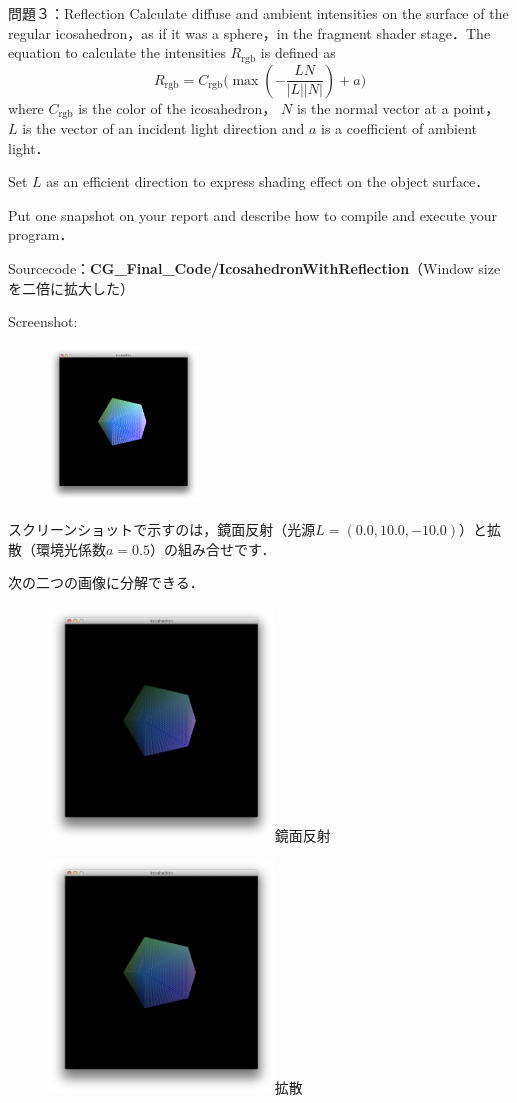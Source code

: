 \documentclass[a4paper,11pt]{jsarticle}
\numberwithin{theorem}{section}  %
\numberwithin{equation}{section} %
\begin{document}
\newpage

\begin{itembox}[l]{問題３：Reflection}
Calculate diffuse and ambient intensities on the surface of the regular icosahedron，as if it was a sphere，in the fragment shader stage．The equation to calculate the intensities $R_{\text{rgb}}$ is defined as
\[
R_{\text{rgb}} = C_{\text{rgb}}\Bigr( \max ( - \frac{LN}{|L||N|} ) + a \Bigr)
\]
where $C_{\text{rgb}}$ is the color of
the icosahedron， $N$ is the normal vector at a point， $L$ is the vector of an incident light direction and $a$ is a coefficient of
ambient light．

Set $L$ as an efficient direction to express shading effect on the object surface．



Put one snapshot on your report and describe how to compile and execute your program．
\end{itembox}

Sourcecode：{\bf CG\_Final\_Code/IcosahedronWithReflection}（Window sizeを二倍に拡大した）

Screenshot:
\begin{figure}[H]
\includegraphics[bb=0 0 444 1200,width=4cm]{Icosahedron_a_and_b.pdf}
\end{figure}
スクリーンショットで示すのは，鏡面反射（光源$L=(0.0,10.0,-10.0)$）と拡散（環境光係数$a=0.5$）の組み合せです．

次の二つの画像に分解できる．
\begin{figure}[H]
\includegraphics[bb=0 0 444 751,width=6cm]{Icosahedron_a.pdf}鏡面反射
\end{figure}
\begin{figure}[H]
\includegraphics[bb=0 0 444 751,width=6cm]{Icosahedron_b.pdf}拡散
\end{figure}
\end{document}
